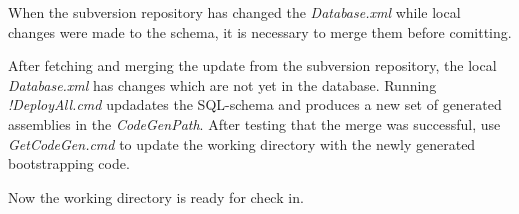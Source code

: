 When the subversion repository has changed the \emph{Database.xml} while
local changes were made to the schema, it is necessary to merge them
before comitting.

After fetching and merging the update from the subversion repository,
the local \emph{Database.xml} has changes which are not yet in the
database. Running \emph{!DeployAll.cmd} updadates the SQL-schema and
produces a new set of generated assemblies in the \emph{CodeGenPath}.
After testing that the merge was successful, use \emph{GetCodeGen.cmd}
to update the working directory with the newly generated bootstrapping
code.

Now the working directory is ready for check in.



